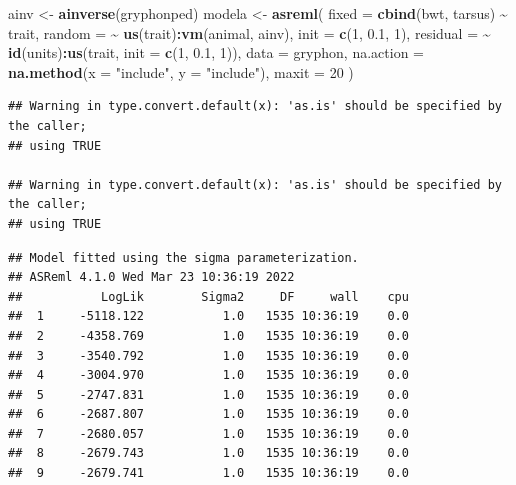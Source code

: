 \documentclass[
  12pt,
]{book}
\newenvironment{Shaded}{\begin{snugshade}}{\end{snugshade}}
\newcommand{\DataTypeTok}[1]{\textcolor[rgb]{0.13,0.29,0.53}{#1}}
\newcommand{\DecValTok}[1]{\textcolor[rgb]{0.00,0.00,0.81}{#1}}
\newcommand{\FloatTok}[1]{\textcolor[rgb]{0.00,0.00,0.81}{#1}}
\newcommand{\KeywordTok}[1]{\textcolor[rgb]{0.13,0.29,0.53}{\textbf{#1}}}
\newcommand{\NormalTok}[1]{#1}
\newcommand{\OperatorTok}[1]{\textcolor[rgb]{0.81,0.36,0.00}{\textbf{#1}}}
\newcommand{\StringTok}[1]{\textcolor[rgb]{0.31,0.60,0.02}{#1}}
\begin{document}
\begin{Shaded}
\begin{Highlighting}[]
\NormalTok{ainv \textless{}{-}}\StringTok{ }\KeywordTok{ainverse}\NormalTok{(gryphonped)}
\NormalTok{modela \textless{}{-}}\StringTok{ }\KeywordTok{asreml}\NormalTok{(}
  \DataTypeTok{fixed =} \KeywordTok{cbind}\NormalTok{(bwt, tarsus) }\OperatorTok{\textasciitilde{}}\StringTok{ }\NormalTok{trait,}
  \DataTypeTok{random =} \OperatorTok{\textasciitilde{}}\StringTok{ }\KeywordTok{us}\NormalTok{(trait)}\OperatorTok{:}\KeywordTok{vm}\NormalTok{(animal, ainv), }\DataTypeTok{init =} \KeywordTok{c}\NormalTok{(}\DecValTok{1}\NormalTok{, }\FloatTok{0.1}\NormalTok{, }\DecValTok{1}\NormalTok{),}
  \DataTypeTok{residual =} \OperatorTok{\textasciitilde{}}\StringTok{ }\KeywordTok{id}\NormalTok{(units)}\OperatorTok{:}\KeywordTok{us}\NormalTok{(trait, }\DataTypeTok{init =} \KeywordTok{c}\NormalTok{(}\DecValTok{1}\NormalTok{, }\FloatTok{0.1}\NormalTok{, }\DecValTok{1}\NormalTok{)),}
  \DataTypeTok{data =}\NormalTok{ gryphon,}
  \DataTypeTok{na.action =} \KeywordTok{na.method}\NormalTok{(}\DataTypeTok{x =} \StringTok{"include"}\NormalTok{, }\DataTypeTok{y =} \StringTok{"include"}\NormalTok{),}
  \DataTypeTok{maxit =} \DecValTok{20}
\NormalTok{)}
\end{Highlighting}
\end{Shaded}

\begin{verbatim}
## Warning in type.convert.default(x): 'as.is' should be specified by the caller;
## using TRUE

## Warning in type.convert.default(x): 'as.is' should be specified by the caller;
## using TRUE
\end{verbatim}

\begin{verbatim}
## Model fitted using the sigma parameterization.
## ASReml 4.1.0 Wed Mar 23 10:36:19 2022
##           LogLik        Sigma2     DF     wall    cpu
##  1     -5118.122           1.0   1535 10:36:19    0.0
##  2     -4358.769           1.0   1535 10:36:19    0.0
##  3     -3540.792           1.0   1535 10:36:19    0.0
##  4     -3004.970           1.0   1535 10:36:19    0.0
##  5     -2747.831           1.0   1535 10:36:19    0.0
##  6     -2687.807           1.0   1535 10:36:19    0.0
##  7     -2680.057           1.0   1535 10:36:19    0.0
##  8     -2679.743           1.0   1535 10:36:19    0.0
##  9     -2679.741           1.0   1535 10:36:19    0.0
\end{verbatim}
\end{document}
